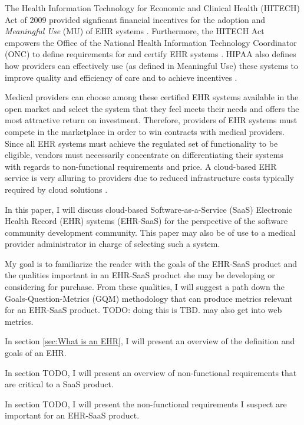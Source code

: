 \documentclass[10pt]{article}
\begin{document}
The Health Information Technology for Economic and Clinical Health (HITECH) Act of 2009 provided signficant financial incentives for the adoption and \textit{Meaningful Use} (MU) of EHR systems \cite{ehrbook}.
Furthermore, the HITECH Act empowers the Office of the National Health Information Technology Coordinator (ONC) to define requirements for and certify EHR systems \cite{onc-ehr}.
HIPAA also defines how providers can effectively use (as defined in Meaningful Use) these systems to improve quality and efficiency of care and to achieve incentives \cite{ehrbook}.

Medical providers can choose among these certified EHR systems available in the open market and select the system that they feel meets their needs and offers the most attractive return on investment.
Therefore, providers of EHR systems must compete in the marketplace in order to win contracts with medical providers.
Since all EHR systems must achieve the regulated set of functionality to be eligible, vendors must necessarily concentrate on differentiating their systems with regards to non-functional requirements and price.
A cloud-based EHR service is very alluring to providers due to reduced infrastructure costs typically required by cloud solutions \cite{auditingprivacy}.

In this paper, I will discuss cloud-based Software-as-a-Service (SaaS) Electronic Health Record (EHR) systems (EHR-SaaS) for the perspective
of the software community development community. 
This paper may also be of use to a medical provider administrator in charge of selecting such a system.

My goal is to familiarize the reader with the goals of the EHR-SaaS product and the qualities important in an EHR-SaaS product
she may be developing or considering for purchase.
From these qualities, I will suggest a path down the Goals-Question-Metrics (GQM) methodology that can produce metrics relevant for an EHR-SaaS product.
TODO: doing this is TBD. may also get into web metrics.

In section \ref{sec:What is an EHR}, I will present an overview of the definition and goals of an EHR.

In section TODO, I will present an overview of non-functional requirements that are critical to a SaaS product.

In section TODO, I will present the non-functional requirements I suspect are important for an EHR-SaaS product.
\end{document}
